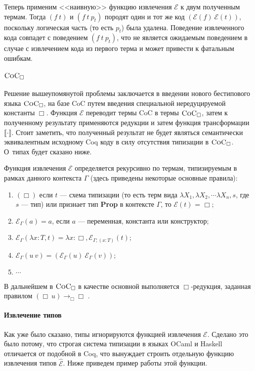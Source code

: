 Теперь применим <<наивную>> функцию извлечения $\mathcal{E}$ к двум полученным термам. Тогда $(f\ t)$ и $(f\ t\ p_t)$ породят один и тот же код $(\mathcal{E}(f)\ \mathcal{E}(t))$, поскольку логическая часть (то есть $p_t$) была удалена. Поведение извлеченного кода совпадет с поведением $(f\ t\ p_t)$, что не является ожидаемым поведением в случае с извлечением кода из первого терма и может привести к фатальным ошибкам.

\paragraph{$\textsc{CoC}_\Box$}

Решение вышеупомянутой проблемы заключается в введении нового бестипового языка $\textsc{CoC}_\Box$, на базе CoC путем введения специальной нередуцируемой константы $\Box$.  Функция $\mathcal{E}$ переводит термы CoC в термы $\textsc{CoC}_\Box$, затем к полученному результату применяются редукции и затем функция трансформации $\llbracket \cdot \rrbracket$. Стоит заметить, что полученный результат не будет являться семантически эквивалентным исходному Coq коду в силу отсутствия типизации в $\textsc{CoC}_\Box$. О~типах будет сказано ниже.

Функция извлечения $\mathcal{E}$ определяется рекурсивно по термам, типизируемым в рамках данного контекста $\Gamma$ (здесь приведены некоторые основные правила):
\begin{enumerate}
\item $(\Box)$ если $t$ --- схема типизации (то есть терм вида $\lambda X_1, \lambda X_2, \cdots \lambda X_n, s$, где $s$ --- тип) или признает  тип \textbf{Prop} в контексте $\Gamma$, то $\mathcal{E}(t)$ = $\Box$;
\item $\mathcal{E}_{\Gamma}(a) = a$, если $a$ --- переменная, константа или конструктор;
\item $\mathcal{E}_{\Gamma}(\lambda x:T, t) = \lambda x :\Box, \mathcal{E}_{\Gamma;(x:T)} (t)$;
\item $\mathcal{E}_{\Gamma} (u\ v) = (\mathcal{E}_{\Gamma} (u)\ \mathcal{E}_{\Gamma} (v))$;
\item $\cdots$
\end{enumerate}

В дальнейшем в $\textsc{CoC}_\Box$ в качестве основной выполняется $\Box$-редукция, заданная правилом $(\Box\ u) \rightarrow_{\Box} \Box$ .

\paragraph{Извлечение типов} Как уже было сказано, типы игнорируются функцией извлечения $\mathcal{E}$. Сделано это было потому, что строгая система типизации в языках OCaml и Haskell отличается от подобной в Coq, что вынуждает строить отдельную функцию извлечения типов $\hat{\mathcal{E}}$. Ниже приведем пример работы этой функции.


